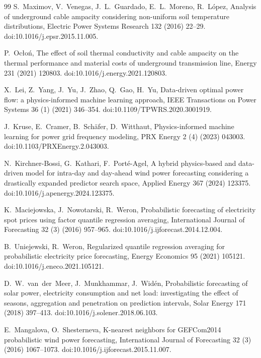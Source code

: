 \begin{thebibliography}{99}
S.~Maximov, V.~Venegas, J.~L.~Guardado, E.~L.~Moreno, R.~L\'opez,
Analysis of underground cable ampacity considering non-uniform soil temperature distributions,
Electric Power Systems Research 132 (2016) 22--29.
doi:10.1016/j.epsr.2015.11.005.

P.~Ocło\'n,
The effect of soil thermal conductivity and cable ampacity on the thermal performance and material costs of underground transmission line,
Energy 231 (2021) 120803.
doi:10.1016/j.energy.2021.120803.

X.~Lei, Z.~Yang, J.~Yu, J.~Zhao, Q.~Gao, H.~Yu,
Data-driven optimal power flow: a physics-informed machine learning approach,
IEEE Transactions on Power Systems 36 (1) (2021) 346--354.
doi:10.1109/TPWRS.2020.3001919.

J.~Kruse, E.~Cramer, B.~Sch\"afer, D.~Witthaut,
Physics-informed machine learning for power grid frequency modeling,
PRX Energy 2 (4) (2023) 043003.
doi:10.1103/PRXEnergy.2.043003.

N.~Kirchner-Bossi, G.~Kathari, F.~Port\'e-Agel,
A hybrid physics-based and data-driven model for intra-day and day-ahead wind power forecasting considering a drastically expanded predictor search space,
Applied Energy 367 (2024) 123375.
doi:10.1016/j.apenergy.2024.123375.

K.~Maciejowska, J.~Nowotarski, R.~Weron,
Probabilistic forecasting of electricity spot prices using factor quantile regression averaging,
International Journal of Forecasting 32 (3) (2016) 957--965.
doi:10.1016/j.ijforecast.2014.12.004.

B.~Uniejewski, R.~Weron,
Regularized quantile regression averaging for probabilistic electricity price forecasting,
Energy Economics 95 (2021) 105121.
doi:10.1016/j.eneco.2021.105121.

D.~W.~van~der~Meer, J.~Munkhammar, J.~Wid\'en,
Probabilistic forecasting of solar power, electricity consumption and net load: investigating the effect of seasons, aggregation and penetration on prediction intervals,
Solar Energy 171 (2018) 397--413.
doi:10.1016/j.solener.2018.06.103.

E.~Mangalova, O.~Shesterneva,
K-nearest neighbors for GEFCom2014 probabilistic wind power forecasting,
International Journal of Forecasting 32 (3) (2016) 1067--1073.
doi:10.1016/j.ijforecast.2015.11.007.


\end{thebibliography}
